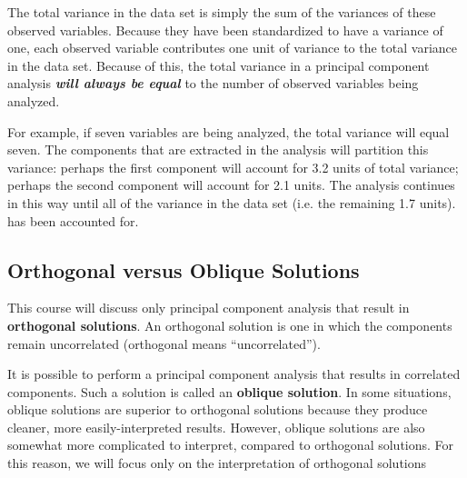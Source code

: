 The total variance in the
data set is simply the sum of the variances of these observed variables.  Because they have
been standardized to have a variance of one, each observed variable contributes one unit of
variance to the total variance in the data set.  Because of this, the total variance in a
principal component analysis \textbf{\emph{will always be equal}} to the number of observed variables
being analyzed.

For example, if seven variables are being analyzed, the total variance will
equal seven.  The components that are extracted in the analysis will partition this variance:
perhaps the first component will account for 3.2 units of total variance; perhaps the second
component will account for 2.1 units.  The analysis continues in this way until all of the
variance in the data set (i.e. the remaining 1.7 units). has been accounted for.

\subsection{Orthogonal versus Oblique Solutions}

This course will discuss only principal component analysis that result in \textbf{orthogonal solutions}.
An orthogonal solution is one in which the components remain uncorrelated (orthogonal means
“uncorrelated”).

It is possible to perform a principal component analysis that results in correlated components.
Such a solution is called an \textbf{oblique solution}.  In some situations, oblique solutions are superior
to orthogonal solutions because they produce cleaner, more easily-interpreted results.
However, oblique solutions are also somewhat more complicated to interpret, compared to
orthogonal solutions.  For this reason, we will focus only on the interpretation of orthogonal solutions


 

